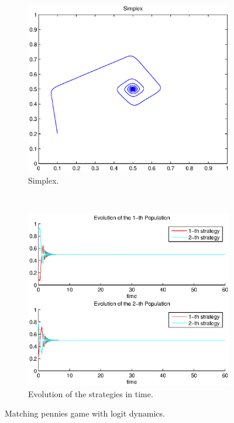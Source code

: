 \documentclass[a4paper,10pt]{article}
\begin{document}
\begin{figure}
  \centering
  \begin{subfigure}[b]{0.45\textwidth}
	  \includegraphics[width=\textwidth]{./images/test2_simplex_logit.eps}
	  \caption{Simplex.}
	  \label{fig:test2_simplex_logit}
  \end{subfigure}
  ~ 
  \begin{subfigure}[b]{0.45\textwidth}
	  \includegraphics[width=\textwidth]{./images/test2_ev_logit.eps}
	  \caption{Evolution of the strategies in time.}
	  \label{fig:test2_ev_logit}
  \end{subfigure}
  \caption{Matching pennies game with logit dynamics.}
  \label{fig:mp_game_logit}
\end{figure}
\end{document}

